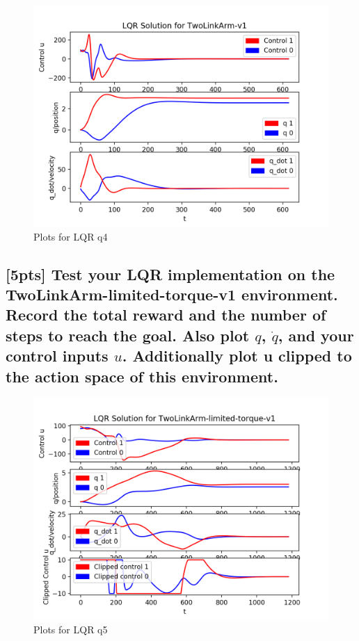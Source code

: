 \documentclass{article}
\begin{document}
\begin{figure}[H] \label{fig:lqr_qn4}
  \centering
  \includegraphics[width=1.2\textwidth]{images/lqr_qn4}
  \caption{Plots for LQR q4}
\end{figure}

\subsection{[5pts] Test your LQR implementation on the TwoLinkArm-limited-torque-v1 environment. Record the total reward and the number of steps to reach the goal. Also plot $q$, $\dot{q}$, and your control inputs $u$. Additionally plot u clipped to the action space of this environment.}

\begin{figure}[H] \label{fig:lqr_qn5}
  \centering
  \includegraphics[width=1.2\textwidth]{images/lqr_qn5}
  \caption{Plots for LQR q5}
\end{figure}
\end{document}
